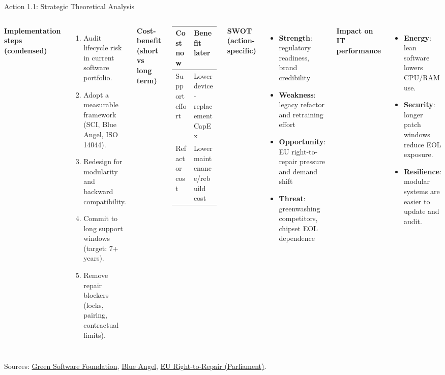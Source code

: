 \documentclass[aspectratio=169]{beamer}
\begin{document}
\begin{frame}{Action 1.1: Strategic Theoretical Analysis}
\scriptsize
\begin{columns}[T,totalwidth=\textwidth]
\textbf{Implementation steps (condensed)}
\begin{enumerate}
  \item Audit lifecycle risk in current software portfolio.
  \item Adopt a measurable framework (SCI, Blue Angel, ISO 14044).
  \item Redesign for modularity and backward compatibility.
  \item Commit to long support windows (target: 7+ years).
  \item Remove repair blockers (locks, pairing, contractual limits).
\end{enumerate}

\textbf{Cost-benefit (short vs long term)}
\begin{tabular}{p{1.9cm}p{2.6cm}}
\toprule
Cost now & Benefit later \\
\midrule
Support effort & Lower device-replacement CapEx \\
Refactor cost & Lower maintenance/rebuild cost \\
\bottomrule
\end{tabular}

\textbf{SWOT (action-specific)}
\begin{itemize}
  \item \textbf{Strength}: regulatory readiness, brand credibility
  \item \textbf{Weakness}: legacy refactor and retraining effort
  \item \textbf{Opportunity}: EU right-to-repair pressure and demand shift
  \item \textbf{Threat}: greenwashing competitors, chipset EOL dependence
\end{itemize}

\textbf{Impact on IT performance}
\begin{itemize}
  \item \textbf{Energy}: lean software lowers CPU/RAM use.
  \item \textbf{Security}: longer patch windows reduce EOL exposure.
  \item \textbf{Resilience}: modular systems are easier to update and audit.
\end{itemize}
\end{columns}
\vspace{0.1cm}
\tiny Sources: \href{https://greensoftware.foundation}{Green Software Foundation}, \href{https://www.blauer-engel.de/en}{Blue Angel}, \href{https://www.europarl.europa.eu/news/en/press-room/20240419IPR20590/right-to-repair-rules-adopted}{EU Right-to-Repair (Parliament)}.
\end{frame}
\end{document}
